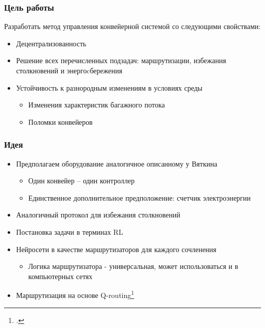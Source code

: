 \documentclass{beamer}
\begin{document}

\begin{frame}
  \frametitle{Цель работы}
  Разработать метод управления конвейерной системой со следующими свойствами:
  \begin{itemize}
  \item Децентрализованность
  \item Решение всех перечисленных подзадач: маршрутизации, избежания столкновений и энергоcбережения
  \item Устойчивость к разнородным изменениям в условиях среды
    \begin{itemize}
    \item Изменения характеристик багажного потока
    \item Поломки конвейеров
    \end{itemize}
  \end{itemize}
\end{frame}


\begin{frame}
  \frametitle{Идея}
  \begin{itemize}
  \item Предполагаем оборудование аналогичное описанному у Вяткина
    \begin{itemize}
    \item Один конвейер -- один контроллер
    \item Единственное дополнительное предположение: счетчик электроэнергии
    \end{itemize}
  \item Аналогичный протокол для избежания столкновений
  \item Постановка задачи в терминах RL
  \item Нейросети в качестве маршрутизаторов для каждого сочленения
     \begin{itemize}
     \item Логика маршрутизатора - универсальная, может использоваться и в компьютерных сетях
     \end{itemize}
  \item Маршрутизация на основе Q-routing\footcite{q-routing-orig}
  \end{itemize}
\end{frame}

\end{document}
